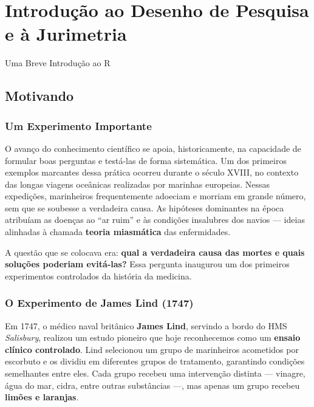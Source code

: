 \documentclass[
  letterpaper,
  DIV=11,
  numbers=noendperiod]{scrreprt}
\begin{document}
\chapter{Introdução ao Desenho de Pesquisa e à
Jurimetria}\label{introduuxe7uxe3o-ao-desenho-de-pesquisa-e-uxe0-jurimetria}

Uma Breve Introdução ao R

\hfill\break

\section{Motivando}\label{motivando}

\subsection{Um Experimento Importante}\label{um-experimento-importante}

O avanço do conhecimento científico se apoia, historicamente, na
capacidade de formular boas perguntas e testá-las de forma sistemática.
Um dos primeiros exemplos marcantes dessa prática ocorreu durante o
século XVIII, no contexto das longas viagens oceânicas realizadas por
marinhas europeias. Nessas expedições, marinheiros frequentemente
adoeciam e morriam em grande número, sem que se soubesse a verdadeira
causa. As hipóteses dominantes na época atribuíam as doenças ao ``ar
ruim'' e às condições insalubres dos navios --- ideias alinhadas à
chamada \textbf{teoria miasmática} das enfermidades.

A questão que se colocava era: \textbf{qual a verdadeira causa das
mortes e quais soluções poderiam evitá-las?} Essa pergunta inaugurou um
dos primeiros experimentos controlados da história da medicina.

\subsection{O Experimento de James Lind
(1747)}\label{o-experimento-de-james-lind-1747}

Em 1747, o médico naval britânico \textbf{James Lind}, servindo a bordo
do HMS \emph{Salisbury}, realizou um estudo pioneiro que hoje
reconhecemos como um \textbf{ensaio clínico controlado}. Lind selecionou
um grupo de marinheiros acometidos por escorbuto e os dividiu em
diferentes grupos de tratamento, garantindo condições semelhantes entre
eles. Cada grupo recebeu uma intervenção distinta --- vinagre, água do
mar, cidra, entre outras substâncias ---, mas apenas um grupo recebeu
\textbf{limões e laranjas}.
\end{document}
